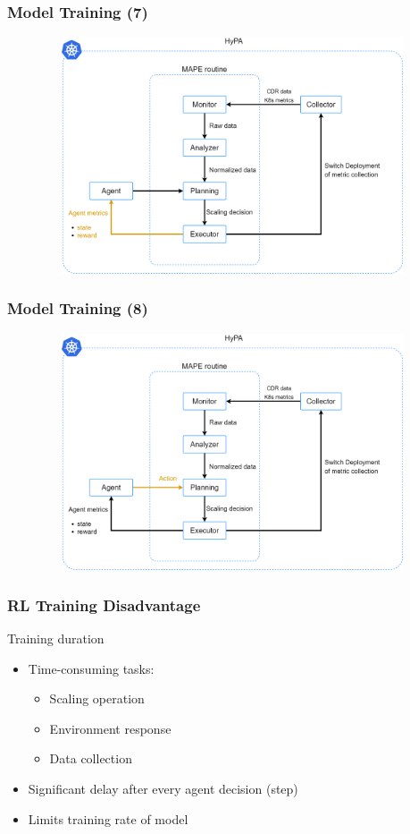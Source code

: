 \documentclass[11pt,t,usepdftitle=false,aspectratio=169]{beamer}
\begin{document}
\begin{frame}
	\frametitle{Model Training (7)}
	
	\begin{figure}
		\centering
		\vspace*{-0.4cm}
		\includegraphics[width=12cm,height=7cm]{_images/trainings_model_6.png}
	\end{figure}
\end{frame}

\begin{frame}
	\frametitle{Model Training (8)}
	
	\begin{figure}
		\centering
		\vspace*{-0.4cm}
		\includegraphics[width=12cm,height=7cm]{_images/trainings_model_7.png}
	\end{figure}
\end{frame}

\begin{frame}
	\frametitle{RL Training Disadvantage}
	
	\begin{alertblock}{Training duration}
		\begin{itemize}
			\item Time-consuming tasks:
			\begin{itemize}
				\item Scaling operation
				\item Environment response
				\item Data collection
			\end{itemize}
			\item Significant delay after every agent decision (step)
			\item Limits training rate of model
		\end{itemize}
	\end{alertblock}
\end{frame}
\end{document}
